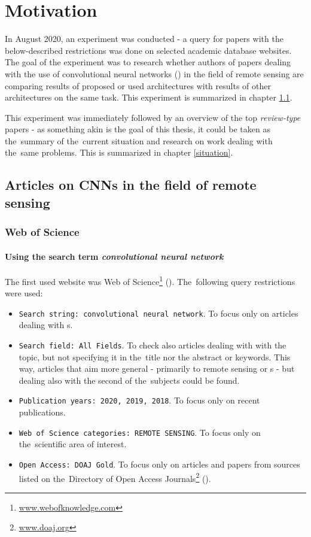 \chapter{Motivation}
\label{motivation}

In August 2020, an experiment was conducted - a query for papers with the below-described restrictions was done on selected academic database websites. The goal of the experiment was to research whether authors of papers dealing with the use of convolutional neural networks () in the field of remote sensing are comparing results of proposed or used architectures with results of other architectures on the same task. This experiment is summarized in chapter \ref{top-papers}.

This experiment was immediately followed by an overview of the top \textit{review-type} papers - as something akin is the goal of this thesis, it could be taken as the~summary of the~current situation and research on work dealing with the~same problems. This is summarized in chapter \ref{situation}.

\section{Articles on CNNs in the field of remote sensing}
\label{top-papers}

\subsection{Web of Science}
\label{wos-papers}

\subsubsection{Using the search term \textit{convolutional neural network}}
\label{wos-papers-full-length}

The first used website was Web of Science\footnote{\url{www.webofknowledge.com}} (). The~following query restrictions were used:

\begin{itemize}
	\item \verb|Search string: convolutional neural network|. To focus only on articles dealing with s.
	\item \verb|Search field: All Fields|. To check also articles dealing with with the topic, but not specifying it in the~title nor the abstract or keywords. This way, articles that aim more general - primarily to remote sensing or s - but dealing also with the second of the~subjects could be found.
	\item \verb|Publication years: 2020, 2019, 2018|. To focus only on recent publications.
	\item \verb|Web of Science categories: REMOTE SENSING|. To focus only on the~scien\-ti\-fic area of interest.
	\item \verb|Open Access: DOAJ Gold|. To focus only on articles and papers from sources listed on the~Di\-rectory of Open Access Journals\footnote{\url{www.doaj.org}} ().
\end{itemize}

